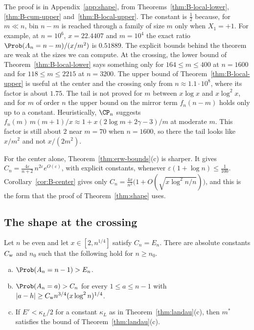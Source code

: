 The proof is in Appendix~\ref{app:shape}, from
Theorems~\ref{thm:B-local-lower}, \ref{thm:B-cum-upper}
and~\ref{thm:B-local-upper}. The constant is $\frac12$ because, for
$m\ll n$, bin $n-m$ is reached through a family of size $m$ only when
$X_1=+1$. For example, at $n=10^6$, $x=22.4407$ and $m=10^4$ the exact ratio
$\Prob(A_n=n-m)/(x/m^2)$ is $0.51889$. The explicit bounds behind the
theorem are weak at the sizes we can compute. At the crossing, the lower
bound of Theorem~\ref{thm:B-local-lower} says something only for
$164\le m\le400$ at $n=1600$ and for $118\le m\le2215$ at $n=3200$. The
upper bound of Theorem~\ref{thm:B-local-upper} is useful at the center and
the crossing only from $n\approx1.1\cdot10^8$, where its factor is about
$1.75$. The tail is not proved for $m$ between $x\log x$ and $x\log^2x$, and
for $m$ of order $n$ the upper bound on the mirror term $f_n(n-m)$ holds
only up to a constant. Heuristically, $\CP_n$ suggests
$f_n(m)\,m(m+1)/x\approx1+x(2\log m+2\gamma-3)/m$ at moderate $m$. This
factor is still about $2$ near $m=70$ when $n=1600$, so there the tail looks
like $x/m^2$ and not $x/(2m^2)$.

\begin{remark}\label{rem:center-value}
For the center alone, Theorem~\ref{thm:erw-bounds}(c) is sharper. It gives
$C_n=\frac{4\varepsilon}{n+2}\,n^{2\varepsilon}e^{O(\varepsilon)}$, with
explicit constants, whenever $\varepsilon(1+\log n)\le\frac1{100}$.
Corollary~\ref{cor:B-center} gives only
$C_n=\frac{4x}{n^2}\bigl(1+O(\sqrt{x\log^2n/n})\bigr)$, and this is the form
that the proof of Theorem~\ref{thm:shape} uses.
\end{remark}

\subsection{The shape at the crossing}

\begin{theorem}\label{thm:shape}
Let $n$ be even and let $x\in[2,n^{1/4}]$ satisfy $C_n=E_n$. There are
absolute constants $C_{\rm w}$ and $n_0$ such that the following hold for
$n\ge n_0$.
\begin{enumerate}[(a)]
\item $\Prob(A_n=n-1)>E_n$.
\item $\Prob(A_n=a)>C_n$ for every $1\le a\le n-1$ with
$\lvert a-h\rvert\ge C_{\rm w}n^{3/4}(x\log^2n)^{1/4}$.
\item If $E'<\kappa_L/2$ for a constant $\kappa_L$ as in
Theorem~\ref{thm:landau}(c), then $m^*$ satisfies the bound of
Theorem~\ref{thm:landau}(c).
\end{enumerate}
\end{theorem}

